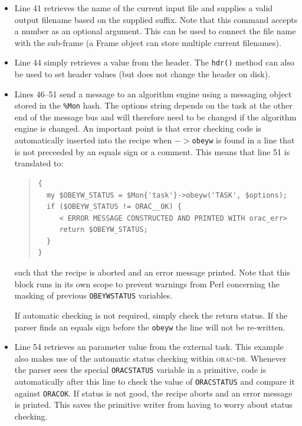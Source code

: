 \documentclass[twoside,11pt]{article}
\renewcommand{\_}{\texttt{\symbol{95}}}
\newcommand{\Oracdr}{\textsc{orac-dr}}
\newenvironment{myquote}{\begin{quote}\begin{small}}{\end{small}\end{quote}}
\begin{document}
\begin{itemize}
\item Line 41 retrieves the name of the current input file and
supplies a valid output filename based on the supplied suffix. Note
that this command accepts a number as an optional argument. This 
can be used to connect the file name with the sub-frame (a Frame
object can store multiple current filenames).

\item Line 44 simply retrieves a value from the header. The
\texttt{hdr()} method can also be used to set header values (but does
not change the header on disk).

\item Lines 46--51 send a message to an algorithm engine using a
messaging object stored in the \texttt{\%Mon} hash. The options
string depends on the task at the other end of the message bus and
will therefore need to be changed if the algorithm engine is changed.
An important point is that error checking code is automatically
inserted into the recipe when  \texttt{$->$obeyw} is found in a line
that is not preceeded by an equals sign or a comment. This means that
line 51 is translated to:
\begin{myquote}
\begin{verbatim}
{
  my $OBEYW_STATUS = $Mon{'task'}->obeyw('TASK', $options);
  if ($OBEYW_STATUS != ORAC__OK) {
     < ERROR MESSAGE CONSTRUCTED AND PRINTED WITH orac_err>
     return $OBEYW_STATUS;
  }
}
\end{verbatim}
\end{myquote} %
such that the recipe is aborted and an error message printed. Note
that this block runs in its own scope to prevent warnings from Perl
concerning the masking of previous \texttt{OBEYW\_STATUS} variables.

If automatic checking is not required, simply check the return
status. If the parser finds an equals sign before the \texttt{obeyw}
the line will not be re-written.

\item Line 54 retrieves an parameter value from the external task.
This example also makes use of the automatic status checking within
\Oracdr. Whenever the parser sees the special \texttt{ORAC\_STATUS}
variable in a primitive, code is automatically after this line to
check the value of \texttt{ORAC\_STATUS} and compare it against
\texttt{ORAC\_\_OK}. If status is not good, the recipe aborts and an
error message is printed. This saves the primitive writer from having
to worry about status checking.


\end{itemize}
\end{document}
